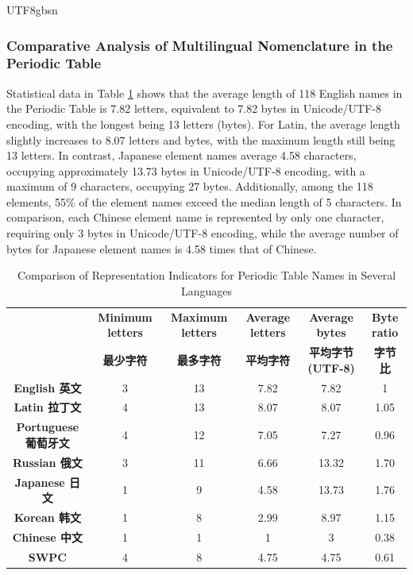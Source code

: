 \documentclass[conference]{IEEEtran}
\begin{document}
\begin{CJK*}{UTF8}{gbsn}
\subsubsection{Comparative Analysis of Multilingual Nomenclature in the Periodic Table}
Statistical data in Table \ref{tab:letter_byte_comparison} shows that the average length of 118 English names in the Periodic Table is 7.82 letters, equivalent to 7.82 bytes in Unicode/UTF-8 encoding, with the longest being 13 letters (bytes). For Latin, the average length slightly increases to 8.07 letters and bytes, with the maximum length still being 13 letters. In contrast, Japanese element names average 4.58 characters, occupying approximately 13.73 bytes in Unicode/UTF-8 encoding, with a maximum of 9 characters, occupying 27 bytes. Additionally, among the 118 elements, 55\% of the element names exceed the median length of 5 characters. In comparison, each Chinese element name is represented by only one character, requiring only 3 bytes in Unicode/UTF-8 encoding, while the average number of bytes for Japanese element names is 4.58 times that of Chinese.

\begin{table}[h!]
\centering
\caption{Comparison of Representation Indicators for Periodic Table Names in Several Languages}
\begin{tabular}{|c|c|c|c|c|c|}
\hline
 & \textbf{Minimum letters} & \textbf{Maximum letters} & \textbf{Average letters} & \textbf{Average bytes} & \textbf{Byte ratio} \\ 
 & \textbf{最少字符} & \textbf{最多字符} & \textbf{平均字符} & \textbf{平均字节(UTF-8)} & \textbf{字节比} \\ \hline
\textbf{English 英文} & 3 & 13 & 7.82 & 7.82 & 1 \\ \hline
\textbf{Latin 拉丁文} & 4 & 13 & 8.07 & 8.07 & 1.05 \\ \hline
\textbf{Portuguese 葡萄牙文} & 4 & 12 & 7.05 & 7.27 & 0.96 \\ \hline
\textbf{Russian 俄文} & 3 & 11 & 6.66 & 13.32 & 1.70 \\ \hline
\textbf{Japanese 日文} & 1 & 9 & 4.58 & 13.73 & 1.76 \\ \hline
\textbf{Korean 韩文} & 1 & 8 & 2.99 & 8.97 & 1.15 \\ \hline
\textbf{Chinese 中文} & 1 & 1 & 1 & 3 & 0.38 \\ \hline
\textbf{SWPC} & 4 & 8 & 4.75 & 4.75 & 0.61 \\ \hline
\end{tabular}
\label{tab:letter_byte_comparison}
\end{table}


\end{CJK*}
\end{document}
